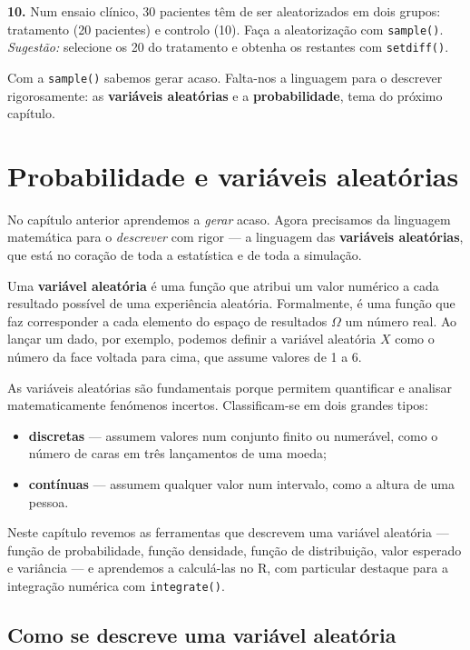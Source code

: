 \documentclass[
  portuguese,
  11pt,
  openany]{book}
\providecommand{\tightlist}{%
  \setlength{\itemsep}{0pt}\setlength{\parskip}{0pt}}
\begin{document}
\textbf{10.} Num ensaio clínico, 30 pacientes têm de ser aleatorizados em dois grupos:
tratamento (20 pacientes) e controlo (10). Faça a aleatorização com \texttt{sample()}.
\emph{Sugestão:} selecione os 20 do tratamento e obtenha os restantes com \texttt{setdiff()}.

Com a \texttt{sample()} sabemos gerar acaso. Falta-nos a linguagem para o descrever
rigorosamente: as \textbf{variáveis aleatórias} e a \textbf{probabilidade}, tema do próximo
capítulo.

\chapter{Probabilidade e variáveis aleatórias}\label{probabilidade}

No capítulo anterior aprendemos a \emph{gerar} acaso. Agora precisamos da linguagem
matemática para o \emph{descrever} com rigor --- a linguagem das \textbf{variáveis aleatórias}, que
está no coração de toda a estatística e de toda a simulação.

Uma \textbf{variável aleatória} é uma função que atribui um valor numérico a cada resultado
possível de uma experiência aleatória. Formalmente, é uma função que faz corresponder a
cada elemento do espaço de resultados \(\Omega\) um número real. Ao lançar um dado, por
exemplo, podemos definir a variável aleatória \(X\) como o número da face voltada para
cima, que assume valores de 1 a 6.

As variáveis aleatórias são fundamentais porque permitem quantificar e analisar
matematicamente fenómenos incertos. Classificam-se em dois grandes tipos:

\begin{itemize}
\tightlist
\item
  \textbf{discretas} --- assumem valores num conjunto finito ou numerável, como o número de
  caras em três lançamentos de uma moeda;
\item
  \textbf{contínuas} --- assumem qualquer valor num intervalo, como a altura de uma pessoa.
\end{itemize}

Neste capítulo revemos as ferramentas que descrevem uma variável aleatória --- função de
probabilidade, função densidade, função de distribuição, valor esperado e variância --- e
aprendemos a calculá-las no R, com particular destaque para a integração numérica com
\texttt{integrate()}.

\section{Como se descreve uma variável aleatória}\label{como-se-descreve-uma-variuxe1vel-aleatuxf3ria}
\end{document}
